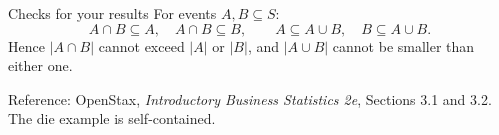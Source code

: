 \documentclass[aspectratio=169,11pt,english]{beamer}
\begin{document}
\begin{frame}{Checks for your results}
For events $A,B\subseteq S$:
\[
A\cap B\subseteq A,\quad A\cap B\subseteq B,\qquad
A\subseteq A\cup B,\quad B\subseteq A\cup B.
\]
Hence $|A\cap B|$ cannot exceed $|A|$ or $|B|$, and $|A\cup B|$ cannot be smaller than either one.

\medskip
\scriptsize Reference: OpenStax, \emph{Introductory Business Statistics 2e}, Sections 3.1 and 3.2. The die example is self-contained.
\end{frame}
\end{document}

